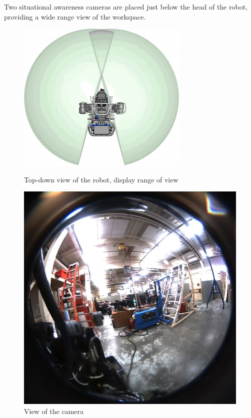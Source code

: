 \documentclass[12pt]{report}
\begin{document}
Two situational awareness cameras are placed just below the head of the robot, providing a wide range view of the workspace.

\begin{figure}[ht]
\begin{center}
\begin{minipage}[b]{0.4\linewidth}
\centering
\includegraphics[width=\textwidth]{images/sitcamFOV.png}
\caption{Top-down view of the robot, display range of view}
\label{fig:figure1}
\end{minipage}
\hspace{0.5cm}
\begin{minipage}[b]{0.4\linewidth}
\centering
\includegraphics[width=\textwidth]{images/fisheye.jpg}
\caption{View of the camera}
\label{fig:figure2}
\end{minipage}
\end{center}
\end{figure}
\end{document}
